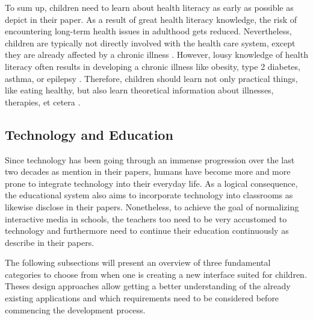 To sum up, children need to learn about health literacy as early as possible as \textcite{velardo2017emphasizing, paakkari2012health, dudley2015teaching} depict in their paper. As a result of great health literacy knowledge, the risk of encountering long-term health issues in adulthood gets reduced. Nevertheless, children are typically not directly involved with the health care system, except they are already affected by a chronic illness \autocite{manganello2007health}. However, lousy knowledge of health literacy often results in developing a chronic illness like obesity, type 2 diabetes, asthma, or epilepsy \autocite{velardo2017emphasizing}. 
Therefore, children should learn not only practical things, like eating healthy, but also learn theoretical information about illnesses, therapies, et cetera \autocite{dudley2015teaching, paakkari2012health}.

\subsection{Technology and Education}
\label{subsection:TechnologyEducation}
Since technology has been going through an immense progression over the last two decades as \textcite{walker2000screen, liu2005reading} mention in their papers, humans have become more and more prone to integrate technology into their everyday life. As a logical consequence, the educational system also aims to incorporate technology into classrooms as \textcite{walker2000screen, engen2014ipads, gan2015enhancing, lozano2016dedigitalizing, nouri2016teaching} likewise disclose in their papers. 
Nonetheless, to achieve the goal of normalizing interactive media in schools, the teachers too need to be very accustomed to technology and furthermore need to continue their education continuously as \textcite{saidin2015review, cabero2016educational} describe in their papers.

The following subsections will present an overview of three fundamental categories to choose from when one is creating a new interface suited for children. Theses design approaches allow getting a better understanding of the already existing applications and which requirements need to be considered before commencing the development process.

